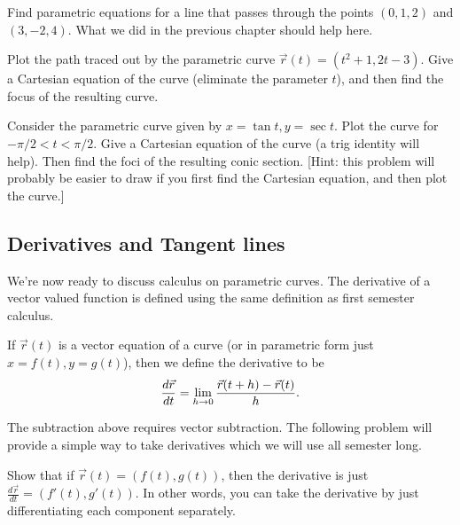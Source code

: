 \begin{problem}\label{line equation to refer to}
Find parametric equations for a line that passes through the points $(0,1,2)$ and $(3,-2,4)$. What we did in the previous chapter should help here.  
\end{problem}

\begin{problem}
Plot the path traced out by the parametric curve $\vec r(t)= (t^2+1, 2t-3).$ Give a Cartesian equation of the curve (eliminate the parameter $t$), and then find the focus of the resulting curve.
\end{problem}

\begin{problem}
Consider the parametric curve given by $x=\tan t, y=\sec t$. Plot the curve for $-\pi/2<t<\pi/2$. Give a Cartesian equation of the curve (a trig identity will help).  Then find the foci of the resulting conic section. [Hint: this problem will probably be easier to draw if you first find the Cartesian equation, and then plot the curve.]
\end{problem}

\subsection{Derivatives and Tangent lines}
We're now ready to discuss calculus on parametric curves. The derivative of a vector valued function is defined using the same definition as first semester calculus.

\begin{definition}
If $\vec r(t)$ is a vector equation of a curve (or in parametric form just $x=f(t), y=g(t)$), then we define the derivative to be $$\frac{d\vec r}{dt}=\displaystyle\lim_{h\to 0}\frac{\vec r(t+h)-\vec r(t)}{h}.$$
\end{definition}
The subtraction above requires vector subtraction.  The following problem will provide a simple way to take derivatives which we will use all semester long.

\begin{problem} 
Show that if $\vec r(t) = (f(t),g(t))$, then the derivative is just $\frac{d\vec r}{dt} = (f'(t),g'(t))$.  In other words, you can take the derivative by just differentiating each component separately.  
\end{problem}


